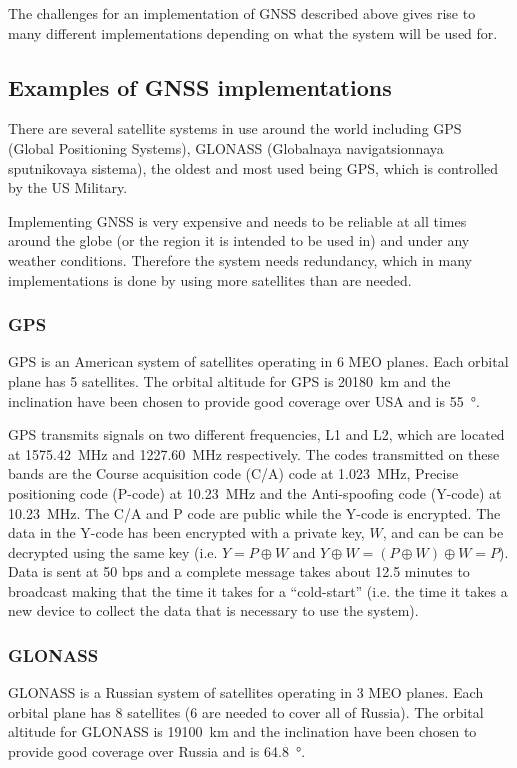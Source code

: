 \documentclass[12pt,a4paper]{article}
\begin{document}
\noindent The challenges for an implementation of GNSS described above gives rise to many different implementations depending on what the system will be used for.

\subsection{Examples of GNSS implementations}
There are several satellite systems in use around the world including GPS (Global Positioning Systems), GLONASS (Globalnaya navigatsionnaya sputnikovaya sistema), the oldest and most used being GPS, which is controlled by the US Military.

Implementing GNSS is very expensive and needs to be reliable at all times around the globe (or the region it is intended to be used in) and under any weather conditions.
Therefore the system needs redundancy, which in many implementations is done by using more satellites than are needed.

\subsubsection{GPS}
GPS is an American system of satellites operating in 6 MEO planes.
Each orbital plane has 5 satellites.
The orbital altitude for GPS is \SI{20180}{\kilo\metre} and the inclination have been chosen to provide good coverage over USA and is \SI{55}{\degree}.

GPS transmits signals on two different frequencies, L1 and L2, which are located at \SI{1575.42}{\mega\hertz} and \SI{1227.60}{\mega\hertz} respectively.
The codes transmitted on these bands are the Course acquisition code (C/A) code at \SI{1.023}{\mega\hertz}, Precise positioning code (P-code) at \SI{10.23}{\mega\hertz} and the Anti-spoofing code (Y-code) at \SI{10.23}{\mega\hertz}.
The C/A and P code are public while the Y-code is encrypted.
The data in the Y-code has been encrypted with a private key, $W$, and can be can be decrypted using the same key (i.e. $Y=P\oplus W$ and $Y\oplus W = (P\oplus W)\oplus W = P$).
Data is sent at 50 bps and a complete message takes about 12.5 minutes to broadcast making that the time it takes for a ``cold-start'' (i.e. the time it takes a new device to collect the data that is necessary to use the system).

\subsubsection{GLONASS}
GLONASS is a Russian system of satellites operating in 3 MEO planes.
Each orbital plane has 8 satellites (6 are needed to cover all of Russia).
The orbital altitude for GLONASS is \SI{19100}{\kilo\metre} and the inclination have been chosen to provide good coverage over Russia and is \SI{64.8}{\degree}.
\end{document}
